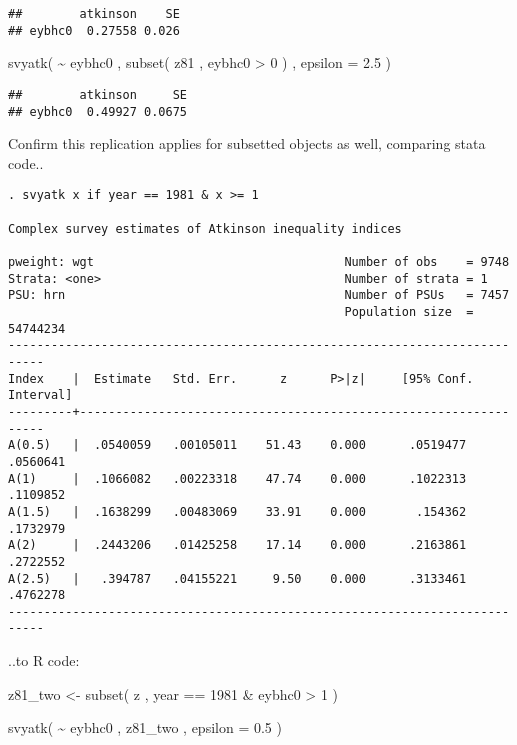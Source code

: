 \documentclass[
]{book}
\newenvironment{Shaded}{\begin{snugshade}}{\end{snugshade}}
\newcommand{\AttributeTok}[1]{\textcolor[rgb]{0.77,0.63,0.00}{#1}}
\newcommand{\DecValTok}[1]{\textcolor[rgb]{0.00,0.00,0.81}{#1}}
\newcommand{\FloatTok}[1]{\textcolor[rgb]{0.00,0.00,0.81}{#1}}
\newcommand{\FunctionTok}[1]{\textcolor[rgb]{0.00,0.00,0.00}{#1}}
\newcommand{\NormalTok}[1]{#1}
\newcommand{\OtherTok}[1]{\textcolor[rgb]{0.56,0.35,0.01}{#1}}
\newcommand{\SpecialCharTok}[1]{\textcolor[rgb]{0.00,0.00,0.00}{#1}}
\begin{document}
\begin{verbatim}
##        atkinson    SE
## eybhc0  0.27558 0.026
\end{verbatim}

\begin{Shaded}
\begin{Highlighting}[]
\FunctionTok{svyatk}\NormalTok{( }\SpecialCharTok{\textasciitilde{}}\NormalTok{ eybhc0 , }\FunctionTok{subset}\NormalTok{( z81 , eybhc0 }\SpecialCharTok{\textgreater{}} \DecValTok{0}\NormalTok{ ) , }\AttributeTok{epsilon =} \FloatTok{2.5}\NormalTok{ )}
\end{Highlighting}
\end{Shaded}

\begin{verbatim}
##        atkinson     SE
## eybhc0  0.49927 0.0675
\end{verbatim}

Confirm this replication applies for subsetted objects as well, comparing stata code..

\begin{verbatim}
. svyatk x if year == 1981 & x >= 1

Complex survey estimates of Atkinson inequality indices
 
pweight: wgt                                   Number of obs    = 9748
Strata: <one>                                  Number of strata = 1
PSU: hrn                                       Number of PSUs   = 7457
                                               Population size  = 54744234
---------------------------------------------------------------------------
Index    |  Estimate   Std. Err.      z      P>|z|     [95% Conf. Interval]
---------+-----------------------------------------------------------------
A(0.5)   |  .0540059   .00105011    51.43    0.000      .0519477   .0560641
A(1)     |  .1066082   .00223318    47.74    0.000      .1022313   .1109852
A(1.5)   |  .1638299   .00483069    33.91    0.000       .154362   .1732979
A(2)     |  .2443206   .01425258    17.14    0.000      .2163861   .2722552
A(2.5)   |   .394787   .04155221     9.50    0.000      .3133461   .4762278
---------------------------------------------------------------------------
\end{verbatim}

..to R code:

\begin{Shaded}
\begin{Highlighting}[]
\NormalTok{z81\_two }\OtherTok{\textless{}{-}} \FunctionTok{subset}\NormalTok{( z , year }\SpecialCharTok{==} \DecValTok{1981} \SpecialCharTok{\&}\NormalTok{ eybhc0 }\SpecialCharTok{\textgreater{}} \DecValTok{1}\NormalTok{ )}

\FunctionTok{svyatk}\NormalTok{( }\SpecialCharTok{\textasciitilde{}}\NormalTok{ eybhc0 , z81\_two , }\AttributeTok{epsilon =} \FloatTok{0.5}\NormalTok{ )}
\end{Highlighting}
\end{Shaded}
\end{document}
